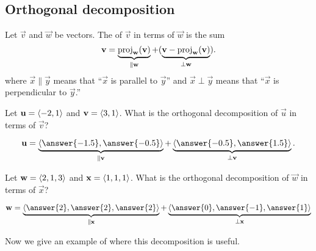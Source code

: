 \documentclass{ximera}
\begin{document}
\subsection{Orthogonal decomposition}

\begin{definition}
Let $\vec v$ and $\vec w$ be vectors. The  of $\vec v$ in terms of $\vec{w}$ is the sum
\[
\mathbf v = \underbrace{\operatorname{proj}_{\mathbf{w}}(\mathbf{v})}_{\parallel \mathbf w} +  (\underbrace{\mathbf v-\operatorname{proj}_{\mathbf{w}}(\mathbf{v})}_{\perp \mathbf w}).
\]
where $\vec{x} \parallel \vec{y}$ means that ``$\vec{x}$ is parallel
to $\vec{y}$'' and $\vec{x} \perp\vec{y}$ means that ``$\vec{x}$ is
perpendicular to $\vec{y}$.''
\end{definition}

\begin{question}
Let $\mathbf u = \left\langle -2,1\right\rangle$ and $\mathbf v = \left\langle 3,1\right\rangle$.  What is the
orthogonal decomposition of $\vec{u}$ in terms of $\vec{v}$?
\begin{prompt}
\[
\vec u= \underbrace{\vector{\answer{-1.5},\answer{-0.5}}}_{\parallel \vec v} + \underbrace{\vector{\answer{-0.5},\answer{1.5}}}_{\perp \vec v}.
\]
\end{prompt}
\begin{question}
  Let $\mathbf w =\left\langle 2,1,3\right\rangle$ and $\mathbf x  =\left\langle  1,1,1\right\rangle$. What is the
  orthogonal decomposition of $\vec{w}$ in terms of $\vec{x}$?
  \begin{prompt}
  \[
  \vec w  = \underbrace{\vector{\answer{2},\answer{2},\answer{2}}}_{\parallel \vec x} + \underbrace{\vector{ \answer{0},\answer{-1},\answer{1}}}_{\perp\vec x}
  \]
  \end{prompt}
\end{question}
\end{question}


Now we give an example of where this decomposition is useful.
\end{document}
